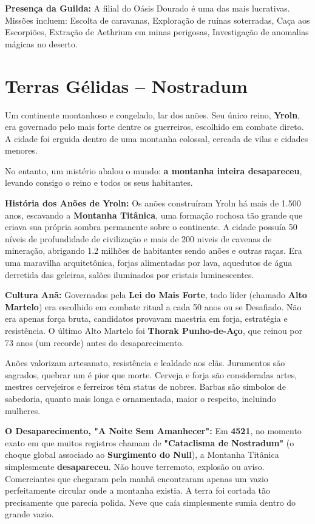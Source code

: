 \textbf{\ringmfamily Presença da Guilda:} A filial do Oásis Dourado é uma das mais lucrativas. Missões incluem: Escolta de caravanas, Exploração de ruínas soterradas, Caça aos Escorpiões, Extração de Aethrium em minas perigosas, Investigação de anomalias mágicas no deserto.

\section*{Terras Gélidas – Nostradum}
Um continente montanhoso e congelado, lar dos anões. Seu único reino, \textbf{Yroln}, era governado pelo mais forte dentre os guerreiros, escolhido em combate direto. A cidade foi erguida dentro de uma montanha colossal, cercada de vilas e cidades menores.

No entanto, um mistério abalou o mundo: \textbf{a montanha inteira desapareceu}, levando consigo o reino e todos os seus habitantes.

\textbf{\ringmfamily História dos Anões de Yroln:}
Os anões construíram Yroln há mais de 1.500 anos, escavando a \textbf{Montanha Titânica}, uma formação rochosa tão grande que criava sua própria sombra permanente sobre o continente. A cidade possuía 50 níveis de profundidade de civilização e mais de 200 niveis de cavenas de mineração, abrigando 1.2 milhões de habitantes sendo anões e outras raças. Era uma maravilha arquitetônica, forjas alimentadas por lava, aquedutos de água derretida das geleiras, salões iluminados por cristais luminescentes.

\textbf{\ringmfamily Cultura Anã:} Governados pela \textbf{Lei do Mais Forte}, todo líder (chamado \textbf{Alto Martelo}) era escolhido em combate ritual a cada 50 anos ou se Desafiado. Não era apenas força bruta, candidatos provavam maestria em forja, estratégia e resistência. O último Alto Martelo foi \textbf{Thorak Punho-de-Aço}, que reinou por 73 anos (um recorde) antes do desaparecimento.

Anões valorizam artesanato, resistência e lealdade aos clãs. Juramentos são sagrados, quebrar um é pior que morte. Cerveja e forja são consideradas artes, mestres cervejeiros e ferreiros têm status de nobres. Barbas são símbolos de sabedoria, quanto mais longa e ornamentada, maior o respeito, incluindo mulheres.

\textbf{\ringmfamily O Desaparecimento, "A Noite Sem Amanhecer":}
Em \textbf{4521}, no momento exato em que muitos registros chamam de \textbf{"Cataclisma de Nostradum"} (o choque global associado ao \textbf{Surgimento do Null}), a Montanha Titânica simplesmente \textbf{desapareceu}. Não houve terremoto, explosão ou aviso. Comerciantes que chegaram pela manhã encontraram apenas um vazio perfeitamente circular onde a montanha existia. A terra foi cortada tão precisamente que parecia polida. Neve que caía simplesmente sumia dentro do grande vazio.

